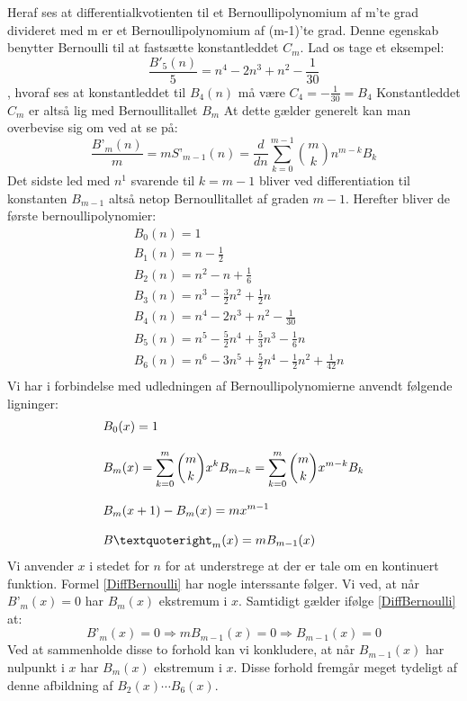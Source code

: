 Heraf ses at differentialkvotienten til et Bernoullipolynomium af m’te grad divideret med m er et Bernoullipolynomium af (m-1)’te grad.
Denne egenskab benytter Bernoulli til at fastsætte konstantleddet \(C_{m}\).
Lad os tage et eksempel: 
\[\frac{B'_{5}(n)}{5}=n^{4}-2n^{3}+n^{2}-\frac{1}{30}\]
, hvoraf ses at konstantleddet til \(B_{4}(n)\) må være \(C_{4}=-\frac{1}{30}=B_{4}\)
Konstantleddet \(C_{m}\) er altså lig med Bernoullitallet \(B_{m}\)
At dette gælder generelt kan man overbevise sig om ved at se på:
\[\frac{B’_{m}(n)}{m}=mS’_{m-1}(n)=\frac{d}{dn}\sum_{k=0}^{m-1}\binom{m}{k}n^{m-k}B_{k}\]
Det sidste led med \(n^{1}\) svarende til \(k=m-1\) bliver ved differentiation til konstanten \(B_{m-1}\) altså netop Bernoullitallet af graden \(m-1\).
Herefter bliver de første bernoullipolynomier:
\begin{align*}
&B_{0}(n)=1\\
&B_{1}(n)=n-\frac{1}{2}\\
&B_{2}(n)=n^{2}-n+\frac{1}{6}\\
&B_{3}(n)=n^{3}-\frac{3}{2}n^{2}+\frac{1}{2}n\\
&B_{4}(n)=n^{4}-2n^{3}+n^{2}-\frac{1}{30}\\
&B_{5}(n)=n^{5}-\frac{5}{2}n^{4}+\frac{5}{3}n^{3}-\frac{1}{6}n\\
&B_{6}(n)=n^{6}-3n^{5}+\frac{5}{2}n^{4}-\frac{1}{2}n^{2}+\frac{1}{42}n\\
\end{align*}
Vi har i forbindelse med udledningen af Bernoullipolynomierne anvendt følgende ligninger:
\begin{align}
&B_{0}(x)=1\nylinie
&B_{m}(x)=\sum_{k=0}^{m}\binom{m}{k}x^{k}B_{m-k}=\sum_{k=0}^{m}\binom{m}{k}x^{m-k}B_{k}\label{BernoulliLign}\nylinie
&B_{m}(x+1)-B_{m}(x)=mx^{m-1}\label{DifferensBernoulli}\nylinie
&B’_{m}(x)=mB_{m-1}(x)\label{DiffBernoulli}
\end{align}
Vi anvender \(x\) i stedet for \(n\) for at understrege at der er tale om en kontinuert funktion.
Formel \ref{DiffBernoulli} har nogle interssante følger.
Vi ved, at når \(B’_{m}(x)=0\) har \(B_{m}(x)\) ekstremum i \(x\). 
Samtidigt gælder ifølge \ref{DiffBernoulli} at:
\begin{equation}
B’_{m}(x)=0 \Rightarrow mB_{m-1}(x)=0 \Rightarrow B_{m-1}(x)=0
\end{equation}
Ved at sammenholde disse to forhold kan vi konkludere, at når \(B_{m-1}(x)\) har nulpunkt i \(x\) har \(B_{m}(x)\) ekstremum i \(x\). Disse forhold fremgår meget tydeligt af denne afbildning af \(B_{2}(x) \dotsm B_{6}(x)\). 
